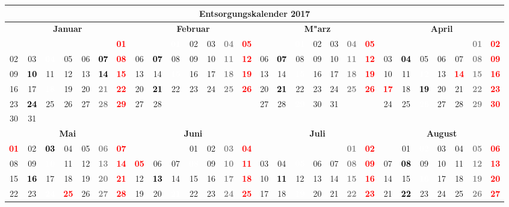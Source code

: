 \documentclass[10pt,a4paper,landscape]{article}
\newcommand{\gb}[1]{\cellcolor{SpringGreen}\textcolor{black}{\bf #1}}
\newcommand{\yb}[1]{\cellcolor{yellow}\textcolor{black}{\bf #1}}
\newcommand{\iv}[1]{\cellcolor{black}\textcolor{white}{\bf #1}}
\newcommand{\rb}[1]{\textbf{\textcolor{red}{#1}}}
\newcommand{\hv}[1]{\textbf{\textcolor{Gray}{#1}}}
\begin{document}
\begin{tabular}{|ccccccc|ccccccc|ccccccc|ccccccc|}
\hline
\multicolumn{28}{|c|}{\textbf{Entsorgungskalender 2017}} \\\hline
\multicolumn{7}{|c|}{\bf Januar} & \multicolumn{7}{|c|}{\bf Februar} & \multicolumn{7}{|c|}{\bf M"arz} & \multicolumn{7}{|c|}{\bf April} \\
& & & & & & \rb{01} & & & \iv{01} & 02 & 03 & \hv{04} & \rb{05} & & & \iv{01} & 02 & 03 & \hv{04} & \rb{05} &  &  &  &  &  & \hv{01} & \rb{02} \\
02 & 03 & \iv{04} & 05 & 06 & \gb{07} & \rb{08} & 06 & \yb{07} & 08 & 09 & 10 & \hv{11} & \rb{12} & 06 & \yb{07} & 08 & 09 & 10 & \hv{11} & \rb{12} & 03 & \yb{04} & 05 & 06 & 07 & \hv{08} & \rb{09} \\
09 & \yb{10} & 11 & 12 & 13 & \gb{14} & \rb{15} & 13 & 14 & \iv{15} & 16 & 17 & \hv{18} & \rb{19} & 13 & 14 & \iv{15} & 16 & 17 & \hv{18} & \rb{19} & 10 & 11 & \iv{12} & 13 & \rb{14} & \hv{15} & \rb{16} \\
16 & 17 & \iv{18} & 19 & 20 & \hv{21} & \rb{22} & 20 & \yb{21} & 22 & 23 & 24 & \hv{25} & \rb{26} & 20 & \yb{21} & 22 & 23 & 24 & \hv{25} & \rb{26} & \rb{17} & 18 & \yb{19} & 20 & 21 & \hv{22} & \rb{23} \\
23 & \yb{24} & 25 & 26 & 27 & \hv{28} & \rb{29} & 27 & 28 & & & & & & 27 & 28 & \iv{29} & 30 & 31 & & & 24 & 25 & \iv{26} & 27 & 28 & \hv{29} & \rb{30} \\
30 & 31 & & & & & & & & & & & & & & & & & & & &  &  &  &  &  &  &  \\
\hline
\multicolumn{7}{|c|}{\bf Mai} & \multicolumn{7}{|c|}{\bf Juni} & \multicolumn{7}{|c|}{\bf Juli} & \multicolumn{7}{|c|}{\bf August} \\
\rb{01} & 02 & \yb{03} & 04 & 05 & \hv{06} & \rb{07} & & & & 01 & 02 & \hv{03} & \rb{04} & & & & & & \hv{01} & \rb{02} & & 01 & \iv{02} & 03 & 04 & \hv{05} & \rb{06} \\
08 & 09 & \iv{10} & 11 & 12 & \hv{13} & \rb{14} & \rb{05} & 06 & 07 & \iv{08} & 09 & \hv{10} & \rb{11} & 03 & 04 & \iv{05} & 06 & 07 & \hv{08} & \rb{09} & 07 & \yb{08} & 09 & 10 & 11 & \hv{12} & \rb{13} \\
15 & \yb{16} & 17 & 18 & 19 & \hv{20} & \rb{21} & 12 & \yb{13} & 14 & 15 & 16 & \hv{17} & \rb{18} & 10 & \yb{11} & 12 & 13 & 14 & \hv{15} & \rb{16} & 14 & 15 & \iv{16} & 17 & 18 & \hv{19} & \rb{20} \\
22 & 23 & \iv{24} & \rb{25} & 26 & \hv{27} & \rb{28} & 19 & 20 & \iv{21} & 22 & 23 & \hv{24} & \rb{25} & 17 & 18 & \iv{19} & 20 & 21 & \hv{22} & \rb{23} & 21 & \yb{22} & 23 & 24 & 25 & \hv{26} & \rb{27} \\

\end{tabular}
\end{document}

